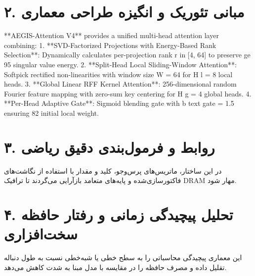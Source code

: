 \documentclass[12pt,a4paper]{article}
\begin{document}
\section*{۲. مبانی تئوریک و انگیزه طراحی معماری}
**AEGIS-Attention V4** provides a unified multi-head attention layer combining: 1. **SVD-Factorized Projections with Energy-Based Rank Selection**: Dynamically calculates per-projection rank r in [4, 64] to preserve ge 95 singular value energy. 2. **Split-Head Local Sliding-Window Attention**: Softpick rectified non-linearities with window size W = 64 for H l = 8 local heads. 3. **Global Linear RFF Kernel Attention**: 256-dimensional random Fourier feature mapping with zero-sum key centering for H g = 4 global heads. 4. **Per-Head Adaptive Gate**: Sigmoid blending gate with b text gate = 1.5 ensuring 82 initial local weight.

\section*{۳. روابط و فرمول‌بندی دقیق ریاضی}
در این ساختار، ماتریس‌های پرس‌وجو، کلید و مقدار با استفاده از نگاشت‌های فاکتورسازی‌شده و پایه‌های متعامد بازآرایی می‌گردند تا ترافیک DRAM مهار شود.

\section*{۴. تحلیل پیچیدگی زمانی و رفتار حافظه سخت‌افزاری}
این معماری پیچیدگی محاسباتی را به سطح خطی یا شبه‌خطی نسبت به طول دنباله تقلیل داده و مصرف حافظه را در مقایسه با مدل مبنا به شدت کاهش می‌دهد.
\end{document}
